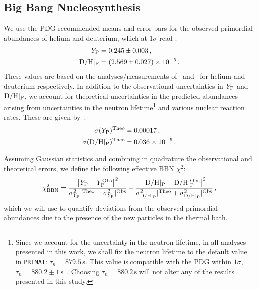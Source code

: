 \documentclass[notitlepage,letterpaper,natbib,aps,prd,onecolumn,amsmath,amsfonts,nofootinbib,preprintnumbers,superscriptaddress,secnumarabic,groupedaddress]{revtex4-1}
\begin{document}
\subsection{Big Bang Nucleosynthesis}\label{sec:BBN_data}

We use the PDG recommended means and error bars for the observed primordial abundances of helium and deuterium, which at $1\sigma$ read \cite{pdg}:
\begin{align}
Y_{\rm P} 	            &= 0.245 \pm 0.003 \label{eq:Yp}\, , \\
{\rm D/H}|_{\rm P}   	&= (2.569  \pm 0.027) \times 10^{-5} \label{eq:DH} \,.
\end{align}
These values are based on the analyses/measurements of~\cite{2017RMxAC..49..181P,Aver:2015iza,Izotov:2014fga} and~\cite{Cooke:2016rky,Balashev:2015hoe,2018MNRAS.477.5536Z,Riemer-Sorensen:2017pey} for helium and deuterium respectively. 
In addition to the observational uncertainties in $Y_{\rm P}$ and ${\rm D/H}|_{\rm P}$, we account for theoretical uncertainties in the predicted abundances arising from uncertainties in the neutron lifetime\footnote{Since we account for the uncertainty in the neutron lifetime, in all analyses presented in this work, we shall fix the neutron lifetime to the default value in \texttt{PRIMAT}: $\tau_n =  879.5\,\text{s}$. This value is compatible with the PDG within $1\sigma$, $\tau_n = 880.2\pm 1\,\text{s}$~\cite{pdg}. Choosing $\tau_n = 880.2\,\text{s}$ will not alter any of the results presented in this study.} and various nuclear reaction rates. These are given by~\cite{Pitrou:2018cgg}:
\begin{align}
\sigma(Y_{\rm P})^{\rm Theo} 	        		&= 0.00017 \,, \\
\sigma({\rm D/H}|_{\rm P} )^{\rm Theo}   	&= 0.036 \times 10^{-5} \label{eq:sigmaDH} \, .
\end{align}

Assuming Gaussian statistics and combining in quadrature the observational and theoretical errors, we define the following effective BBN $\chi^2$: 
\begin{align}\label{eq:chiBBN}
\chi_{\rm BBN}^2 = \frac{\left[Y_{\rm P} - Y_{\rm P}^{\rm Obs}\right]^2}{\sigma_{Y_{\rm P}}^2|{}^{\rm Theo} + \sigma_{Y_{\rm P}}^2|{}^{\rm Obs}} + \frac{\left[{\rm D/H}|_{\rm P} - {\rm D/H}|_{\rm P}^{\rm Obs}\right]^2}{\sigma_{{\rm D/H}|_{\rm P}}^2|{}^{\rm Theo} + \sigma_{{\rm D/H}|_{\rm P}}^2|{}^{\rm Obs}} \, ,
\end{align}
which we will use to quantify deviations from the observed primordial abundances due to the presence of the new particles in the thermal bath.
\end{document}
